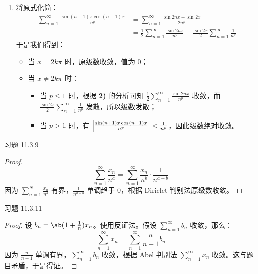 \begin{problem}
\begin{solution}
\begin{enumerate}
\begin{itemize}
                \item 当 $p > 1$ 时，有 $\sum\limits_{n = 1}^{\infty} \abs{(-1)^{n} \frac{\cos 2n}{n^{p}}} \le \sum\limits \frac{1}{n^{p}}$，因此原级数绝对收敛。
            \end{itemize}

            \item[\textbf{6)}] 将原式化简：
            $$
            \begin{aligned}
                \sum_{n = 1}^{\infty} \frac{\sin (n + 1) x \cos (n - 1) x}{n^{p}} & = \sum_{n = 1}^{\infty} \frac{\sin 2n x - \sin 2x}{2 n^{p}} \\
                & = \frac{1}{2} \sum_{n = 1}^{\infty} \frac{\sin 2n x}{n^{p}} - \frac{\sin 2x}{2} \sum_{n = 1}^{\infty} \frac{1}{n^{p}}
            \end{aligned}
            $$
            于是我们得到：
            \begin{itemize}
                \item 当 $x = 2k \pi$ 时，原级数收敛，值为 $0$；
                \item 当 $x \neq 2k \pi$ 时：
                \begin{itemize}
                    \item 当 $p \le 1$ 时，根据 \textbf{2)} 的分析可知 $\frac{1}{2} \sum\limits_{n = 1}^{\infty} \frac{\sin 2n x}{n^{p}}$ 收敛，而 $\frac{\sin 2x}{2} \sum\limits_{n = 1}^{\infty} \frac{1}{n^{p}}$ 发散，所以级数发散；
                    \item 当 $p > 1$ 时，有 $\abs{\frac{\sin (n + 1)x \cos (n - 1)x}{n^{p}}} < \frac{1}{n^{p}}$，因此级数绝对收敛。
                \end{itemize}
            \end{itemize}
        \end{enumerate}
    \end{solution}
\end{problem}

\begin{problem}
    习题 11.3.9
    \begin{proof}
        $$
        \sum_{n = 1}^{\infty} \frac{x_n}{n^{a}} = \sum_{n = 1}^{\infty} \frac{x_n}{n^{b}} \cdot \frac{1}{n^{a - b}}
        $$
        因为 $\sum\limits_{n = 1}^{N} \frac{x_n}{n^{b}}$ 有界，$\frac{1}{n^{{a - b}}}$ 单调趋于 $0$，根据 Diriclet 判别法原级数收敛。
    \end{proof}
\end{problem}

\begin{problem}
    习题 11.3.11
    \begin{proof}
        设 $b_n = \ab(1 + \frac{1}{n}) x_n$。使用反证法。假设 $\sum\limits_{n = 1}^{\infty} b_n$ 收敛，那么：
        $$
        \sum_{n = 1}^{\infty} x_n = \sum_{n = 1}^{\infty} \frac{n}{n + 1} b_n
        $$
        因为 $\frac{n}{n + 1}$ 单调有界，$\sum\limits_{n = 1}^{\infty} b_n$ 收敛，根据 Abel 判别法 $\sum\limits_{n = 1}^{\infty} x_n$ 收敛。这与题目矛盾，于是得证。
    \end{proof}
\end{problem}

